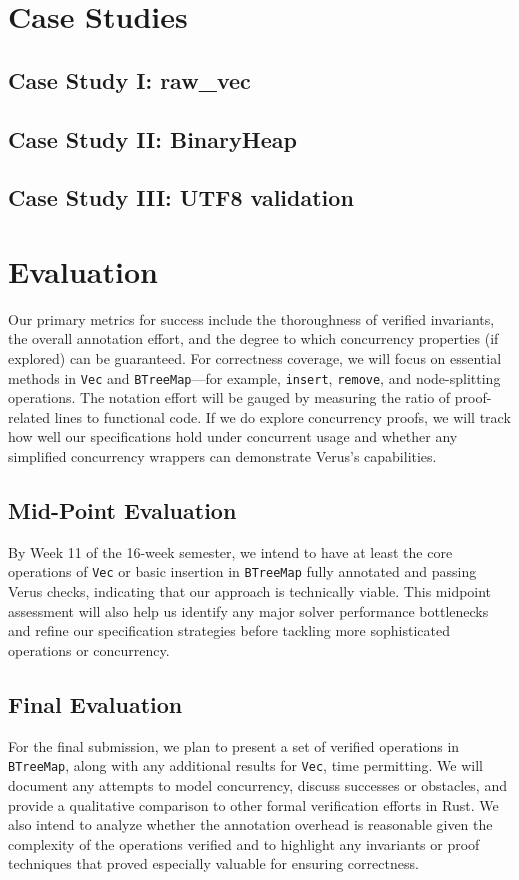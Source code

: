 \documentclass[conference]{IEEEtran}
\begin{document}
\section{Case Studies}
\subsection{Case Study I: raw_vec}
\subsection{Case Study II: BinaryHeap}
\subsection{Case Study III: UTF8 validation}

\section{Evaluation}
Our primary metrics for success include the thoroughness of verified invariants, the overall annotation effort, and the degree to which concurrency properties (if explored) can be guaranteed. For correctness coverage, we will focus on essential methods in \texttt{Vec} and \texttt{BTreeMap}—for example, \texttt{insert}, \texttt{remove}, and node-splitting operations. The notation effort will be gauged by measuring the ratio of proof-related lines to functional code. If we do explore concurrency proofs, we will track how well our specifications hold under concurrent usage and whether any simplified concurrency wrappers can demonstrate Verus’s capabilities.

\subsection{Mid-Point Evaluation}
By Week 11 of the 16-week semester, we intend to have at least the core operations of \texttt{Vec} or basic insertion in \texttt{BTreeMap} fully annotated and passing Verus checks, indicating that our approach is technically viable. This midpoint assessment will also help us identify any major solver performance bottlenecks and refine our specification strategies before tackling more sophisticated operations or concurrency.

\subsection{Final Evaluation}
For the final submission, we plan to present a set of verified operations in \texttt{BTreeMap}, along with any additional results for \texttt{Vec}, time permitting. We will document any attempts to model concurrency, discuss successes or obstacles, and provide a qualitative comparison to other formal verification efforts in Rust. We also intend to analyze whether the annotation overhead is reasonable given the complexity of the operations verified and to highlight any invariants or proof techniques that proved especially valuable for ensuring correctness.
\end{document}
